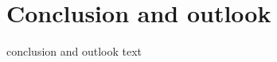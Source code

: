 \documentclass[./main.tex]{subfiles}
\begin{document}
\chapter{Conclusion and outlook}
conclusion and outlook text
\newpage
\end{document}
